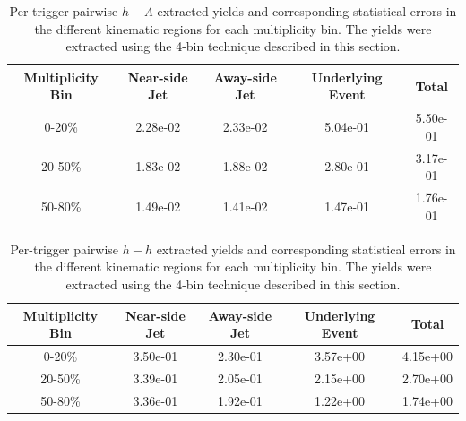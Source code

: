 \documentclass[ALICE,manyauthors]{ALICE_analysis_notes}
\begin{document}
\begin{table}[h!]
\centering
\begin{tabular}{| c | c | c | c | c | }
\hline
Multiplicity Bin & Near-side Jet & Away-side Jet & Underlying Event & Total  \\
\hline
0-20\% & 2.28e-02  & 2.33e-02  & 5.04e-01 & 5.50e-01 \\
20-50\% & 1.83e-02 & 1.88e-02  & 2.80e-01 & 3.17e-01 \\
50-80\% & 1.49e-02 & 1.41e-02  & 1.47e-01 & 1.76e-01 \\
\hline
\end{tabular}
\caption{Per-trigger pairwise $h-\Lambda$ extracted yields and corresponding statistical errors in the different kinematic regions for each multiplicity bin. The yields were extracted using the 4-bin technique described in this section.}
\label{h_lambda_yield_table_4bin}
\end{table}
	
\begin{table}[h!]
\centering
\begin{tabular}{| c | c | c | c | c | }
\hline
Multiplicity Bin & Near-side Jet & Away-side Jet & Underlying Event & Total  \\
\hline

0-20\% & 3.50e-01  & 2.30e-01  & 3.57e+00 & 4.15e+00 \\
20-50\% & 3.39e-01 & 2.05e-01  & 2.15e+00 & 2.70e+00 \\
50-80\% & 3.36e-01 & 1.92e-01  & 1.22e+00 & 1.74e+00 \\

\hline
\end{tabular}
\caption{Per-trigger pairwise $h-h$ extracted yields and corresponding statistical errors in the different kinematic regions for each multiplicity bin. The yields were extracted using the 4-bin technique described in this section.}
\label{h_h_yield_table_4bin}
\end{table}
\end{document}

